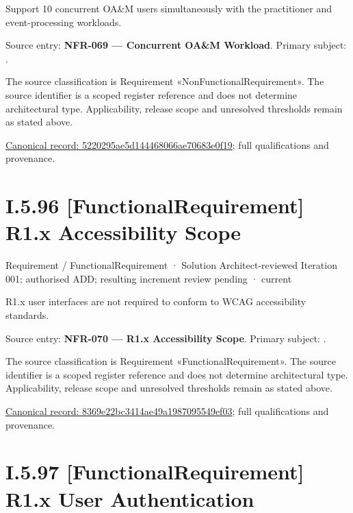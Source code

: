 Support 10 concurrent OA\&M users simultaneously with the practitioner and event-processing workloads.



Source entry: \textbf{NFR-069 — Concurrent OA\&M Workload}. Primary subject: \texttt{}.



The source classification is Requirement «NonFunctionalRequirement». The source identifier is a scoped register reference and does not determine architectural type. Applicability, release scope and unresolved thresholds remain as stated above.


{\footnotesize \href{../../../../../../../continuum/motivation/requirement/non-functional-requirement/5220295ae5d144468066ae70683e0f19.md}{Canonical record: 5220295ae5d144468066ae70683e0f19}; full qualifications and provenance.}\par
\section*{I.5.96 [FunctionalRequirement] R1.x Accessibility Scope}
\label{navigation:I.5.96}

\label{element:8369e22bc3414ae49a1987095549ef03}
{\small Requirement / FunctionalRequirement · Solution Architect-reviewed Iteration 001; authorised ADD; resulting increment review pending · current}\par

R1.x user interfaces are not required to conform to WCAG accessibility standards.



Source entry: \textbf{NFR-070 — R1.x Accessibility Scope}. Primary subject: \texttt{}.



The source classification is Requirement «FunctionalRequirement». The source identifier is a scoped register reference and does not determine architectural type. Applicability, release scope and unresolved thresholds remain as stated above.


{\footnotesize \href{../../../../../../../continuum/motivation/requirement/functional-requirement/8369e22bc3414ae49a1987095549ef03.md}{Canonical record: 8369e22bc3414ae49a1987095549ef03}; full qualifications and provenance.}\par
\section*{I.5.97 [FunctionalRequirement] R1.x User Authentication}
\label{navigation:I.5.97}

